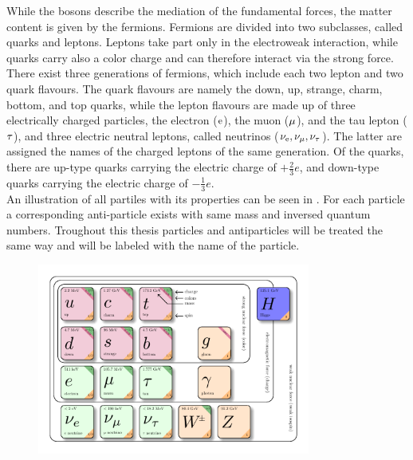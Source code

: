 While the bosons describe the mediation of the fundamental forces, the matter content is given by the fermions. Fermions are divided into two subclasses, called quarks and leptons. Leptons take part only in the electroweak interaction, while quarks carry also a color charge and can therefore interact via the strong force. There exist three generations of fermions, which include each two lepton and two quark flavours. The quark flavours are namely the down, up, strange, charm, bottom, and top quarks, while the lepton flavours are made up of three electrically charged particles, the electron ($\mathrm{e}$), the muon ($\mu$), and the tau lepton ($\tau$), and three electric neutral leptons, called neutrinos ($\nu_\mathrm{{e}},\nu_{\mu},\nu_{\tau}$). The latter are assigned the names of the charged leptons of the same generation. Of the quarks, there are up-type quarks carrying the electric charge of $+\frac{2}{3}e$, and down-type quarks carrying the electric charge of $-\frac{1}{3}e$.\\
An illustration of all partiles with its properties can be seen in .
For each particle a corresponding anti-particle exists with same mass and inversed quantum numbers. Troughout this thesis particles and antiparticles will be treated the same way and will be labeled with the name of the particle.\\

\begin{figure}[!htpb]
\centering
  \includegraphics[width=0.8\textwidth]{figures/general/SM}
  \caption{}
  \label{fig:SM}

\end{figure}


